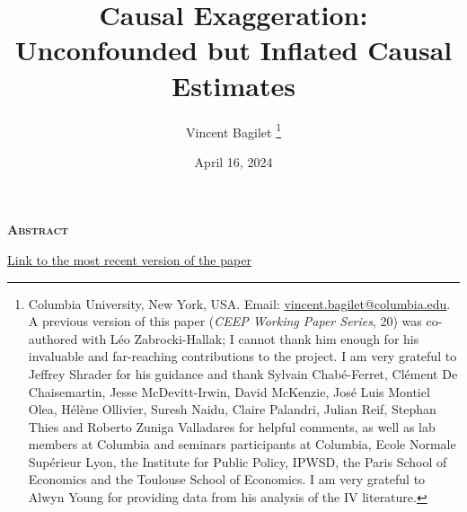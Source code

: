 \documentclass[usletter, 12pt]{article}
\begin{document}

	
	\title{Causal Exaggeration: \\ Unconfounded but Inflated Causal Estimates}

	\author{Vincent Bagilet
		\thanks{Columbia University, New York, USA. Email: \url{vincent.bagilet@columbia.edu}. 
			A previous version of this paper (\textit{CEEP Working Paper Series}, 20) was co-authored with Léo Zabrocki-Hallak; I cannot thank him enough for his invaluable and far-reaching contributions to the project. I am very grateful to Jeffrey Shrader for his guidance and thank Sylvain Chabé-Ferret, Clément De Chaisemartin, Jesse McDevitt-Irwin, David McKenzie, José Luis Montiel Olea, Hélène Ollivier, Suresh Naidu, Claire Palandri, Julian Reif, Stephan Thies and Roberto Zuniga Valladares for helpful comments, as well as lab members at Columbia and seminars participants at Columbia, Ecole Normale Supérieur Lyon, the Institute for Public Policy, IPWSD, the Paris School of Economics and the Toulouse School of Economics. I am very grateful to Alwyn Young for providing data from his analysis of the IV literature.}
	}
	

	\date{April 16, 2024}
	
	\maketitle
	
	\begin{center}
		\large \textsc{\textbf{Abstract}}\\
	\end{center}
	
	
		
			
	\begin{center}
		\href{https://vincentbagilet.github.io/causal_exaggeration/causal_exaggeration_paper.pdf}{Link to the most recent version of the paper}
	\end{center}
	
	
	\newpage
	


	
\end{document}
